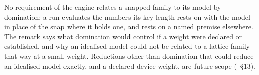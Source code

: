 
No requirement of the engine relates a snapped family to its model by
domination: a run evaluates the numbers its key length rests on with the
model in place of the snap where it holds one, and rests on a named premise
elsewhere. The remark says what domination would control if a weight were
declared or established, and why an idealised model could not be related to
a lattice family that way at a small weight. Reductions other than domination
that could reduce an idealised model exactly, and a declared device weight,
are future scope (~\S13).

